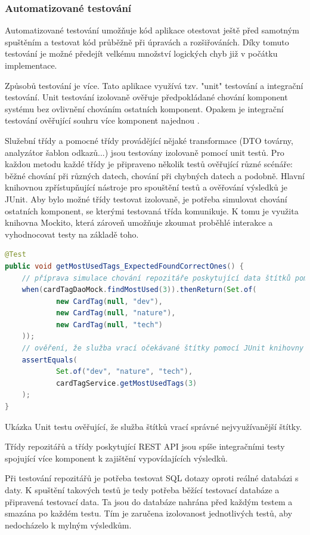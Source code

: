 \begin{itemize}
\begin{itemize}
		\subsubsection{Automatizované testování}

		Automatizované testování umožňuje kód aplikace otestovat ještě před samotným spuštěním a testovat
		kód průběžně při úpravách a rozšiřováních.
		Díky tomuto testování je možné předejít velkému množství logických chyb již v počátku implementace.

		Způsobů testování je více.
		Tato aplikace využívá tzv. "unit" testování a integrační testování.
		Unit testování izolovaně ověřuje předpokládané chování komponent systému bez ovlivnění chováním
		ostatních komponent\cite{unit_testing}.
		Opakem je integrační testování ověřující souhru více komponent najednou \cite{integration_testing}.

		Služební třídy a pomocné třídy provádějící nějaké transformace (\ac{DTO} továrny, analyzátor šablon odkazů...)
		jsou testovány izolovaně pomocí unit testů.
		Pro každou metodu každé třídy je připraveno několik testů ověřující různé scénáře: běžné chování při různých datech,
		chování při chybných datech a podobně.
		Hlavní knihovnou zpřístupňující nástroje pro spouštění testů a ověřování výsledků je JUnit.
		Aby bylo možné třídy testovat izolovaně, je potřeba simulovat chování ostatních komponent, se kterými testovaná
		třída komunikuje.
		K tomu je využita knihovna Mockito, která zároveň umožňuje zkoumat proběhlé interakce a vyhodnocovat testy
		na základě toho.
		\begin{lstlisting}[language=Java]
@Test
public void getMostUsedTags_ExpectedFoundCorrectOnes() {
	// příprava simulace chování repozitáře poskytující data štítků pomocí Mockito knihovny
	when(cardTagDaoMock.findMostUsed(3)).thenReturn(Set.of(
			new CardTag(null, "dev"),
			new CardTag(null, "nature"),
			new CardTag(null, "tech")
	));
	// ověření, že služba vrací očekávané štítky pomocí JUnit knihovny
	assertEquals(
			Set.of("dev", "nature", "tech"),
			cardTagService.getMostUsedTags(3)
	);
}
		\end{lstlisting}
		Ukázka Unit testu ověřující, že služba štítků vrací správné nejvyužívanější štítky. %

		Třídy repozitářů a třídy poskytující \ac{REST} \ac{API} jsou spíše integračními testy spojující více
		komponent k zajištění vypovídajících výsledků.

		Při testování repozitářů je potřeba testovat \ac{SQL} dotazy oproti reálné databázi s daty.
		K spuštění takových testů je tedy potřeba běžící testovací databáze a připravená testovací data.
		Ta jsou do databáze nahrána před každým testem a smazána po každém testu.
		Tím je zaručena izolovanost jednotlivých testů, aby nedocházelo k mylným výsledkům.


\end{itemize}
\end{itemize}
